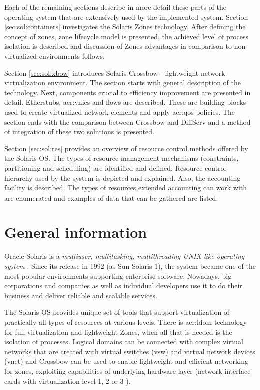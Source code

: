 \documentclass[11pt]{book}
\begin{document}
    Each of the remaining sections describe in more detail these parts of the operating system that are extensively used
    by the implemented system. Section \ref{sec:sol:containers} investigates the Solaris Zones technology. After
    defining the concept of zones, zone lifecycle model is presented, the achieved level of process isolation is
    described and discussion of Zones advantages in comparison to non-virtualized environments follows.

    Section \ref{sec:sol:xbow} introduces Solaris Crossbow - lightweight network virtualization environment. The section
    starts with general description of the technology. Next, components crucial to efficiency improvement are presented
    in detail. Etherstubs, \gls{acr:vnic}s and flows are described. These are building blocks used to create virtualized network
    elements and apply \gls{acr:qos} policies. The section ends with the comparison between Crossbow and DiffServ and a
    method of integration of these two solutions is presented.

    Section \ref{sec:sol:res} provides an overview of resource control methods offered by the Solaris OS. The types of
    resource management mechanisms (constraints, partitioning and scheduling) are identified and defined. Resource
    control hierarchy used by the system is depicted and explained. Also, the accounting facility is described. The
    types of resources extended accounting can work with are enumerated and examples of data that can be gathered are
    listed.


    \section{General information}
    \label{sec:sol:general}

      Oracle Solaris is a \textit{multiuser, multitasking, multithreading UNIX-like operating system} \cite{reference}.
      Since its release in 1992 (as Sun Solaris 1), the system became one of the most popular environments supporting
      enterprise software. Nowadays, big corporations and companies as well as individual developers use it to do their
      business and deliver reliable and scalable services.

      The Solaris OS provides unique set of tools that support virtualization of practically all types of resources at
      various levels. There is \gls{acr:ldom} technology for full virtualization and lightweight Zones, when all that is
      needed is the isolation of processes. Logical domains can be connected with complex virtual networks that are
      created with virtual switches (vsw) and virtual network devices (vnet) \cite{ldomag} and Crossbow can be used to
      enable lightweight and efficient networking for zones, exploiting capabilities of underlying hardware layer
      (network interface cards with virtualization level 1, 2 or 3 \cite{santos}).
\end{document}
